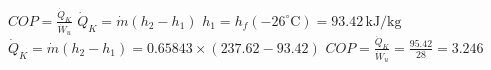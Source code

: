 \( COP = \frac{\dot{Q}_K}{\dot{W}_u} \)  
\( \dot{Q}_K = \dot{m}(h_2 - h_1) \)  
\( h_1 = h_f(-26^\circ \text{C}) = 93.42 \, \text{kJ/kg} \)  
\( \dot{Q}_K = \dot{m}(h_2 - h_1) = 0.65843 \times (237.62 - 93.42) \)  
\( COP = \frac{\dot{Q}_K}{\dot{W}_u} = \frac{95.42}{28} = 3.246 \)